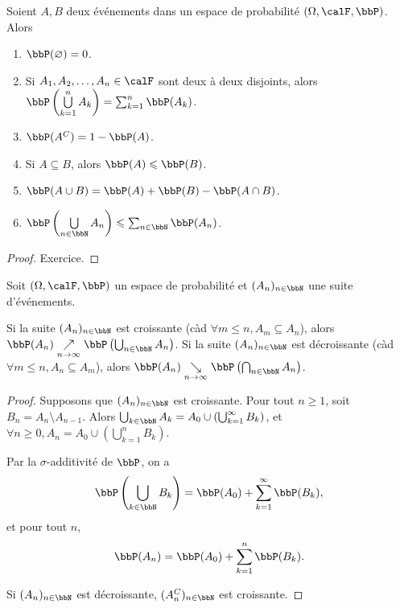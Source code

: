 \begin{thm}
    Soient $A, B$ deux événements dans un espace de probabilité $(\Omega, \calF, \bbP)$.
    Alors
    \begin{enumerate}
        \item $\bbP(\varnothing) = 0$.
        \item Si $A_1, A_2, \ldots, A_n \in \calF$ sont deux à deux disjoints,
              alors $\bbP \left(\bigcup\limits_{k = 1}^n A_k \right) = \sum_{k = 1}^n \bbP(A_k)$.
        \item $\bbP(A^C) = 1 - \bbP(A)$.
        \item Si $A \subseteq B$, alors $\bbP(A) \leqslant \bbP(B)$.
        \item $\bbP(A \cup B) = \bbP(A) + \bbP(B) - \bbP(A \cap B)$.
        \item $\bbP \left(\bigcup\limits_{n \in \bbN} A_n\right) \leqslant \sum_{n \in \bbN} \bbP(A_n)$.
    \end{enumerate}
\end{thm}

\begin{proof}
    Exercice.
\end{proof}

Soit $(\Omega, \calF, \bbP)$ un espace de probabilité et $(A_n)_{n \in \bbN}$ une suite d'événements.

\begin{thm}
    Si la suite $(A_n)_{n \in \bbN}$ est croissante (càd $\forall m \leqslant n, A_m \subseteq A_n$),
    alors $\bbP(A_n) \underset{n \to \infty}{\nearrow} \bbP\left(\bigcup_{n \in \bbN} A_n\right)$.
    Si la suite $(A_n)_{n \in \bbN}$ est décroissante (càd $\forall m \leqslant n, A_n \subseteq A_m$),
    alors $\bbP(A_n) \underset{n \to \infty}{\searrow} \bbP\left(\bigcap_{n \in \bbN} A_n\right)$.
\end{thm}

\begin{proof}
    Supposons que $(A_n)_{n \in \bbN}$ est croissante.
    Pour tout $n \geqslant 1$, soit $B_n = A_n \setminus A_{n-1}$.
    Alors $\bigcup_{k \in \bbN} A_k = A_0 \cup \left(\bigcup_{k = 1}^\infty B_k\right)$,
    et $\forall n \geqslant 0, A_n = A_0 \cup \left(\bigcup_{k = 1}^n B_k\right)$.

    Par la $\sigma$-additivité de $\bbP$, on a
    \[ \bbP\left(\bigcup_{k \in \bbN} B_k\right) = \bbP(A_0) + \sum_{k = 1}^\infty \bbP(B_k), \]
    et pour tout $n$,
    \[ \bbP(A_n) = \bbP(A_0) + \sum_{k = 1}^n \bbP(B_k). \]

    Si $(A_n)_{n \in \bbN}$ est décroissante, $(A_n^C)_{n \in \bbN}$ est croissante.
\end{proof}

